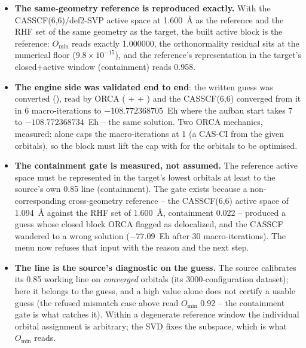 \begin{readbox}
\begin{itemize}
  \item \textbf{The same-geometry reference is reproduced exactly.}  With
    the CASSCF(6,6)/def2-SVP active space at 1.600~\AA{} as the reference
    and the RHF set of the same geometry as the target, the built active
    block is the reference: $O_{\min}$ reads exactly 1.000000, the
    orthonormality residual sits at the numerical floor
    ($9.8\times10^{-15}$), and the reference's representation in the
    target's closed+active window (containment) reads 0.958.
  \item \textbf{The engine side was validated end to end}: the written
    guess was converted (), read by ORCA
    ( +  +  )
    and the CASSCF(6,6) converged from it in 6 macro-iterations to
    $-108.772368705$~Eh where the aufbau start takes 7 to
    $-108.772368734$~Eh -- the same solution.  Two ORCA mechanics, measured:
     alone caps the macro-iterations at 1 (a CAS-CI from the
    given orbitals), so the  block must lift the cap with
     for the orbitals to be optimised.
  \item \textbf{The containment gate is measured, not assumed.}  The
    reference active space must be represented in the target's lowest
     orbitals at least to the source's own 0.85 line
    (containment).  The gate exists because a non-corresponding
    cross-geometry reference -- the CASSCF(6,6) active space of 1.094~\AA{}
    against the RHF set of 1.600~\AA{}, containment 0.022 -- produced a
    guess whose closed block ORCA flagged as delocalized, and the CASSCF
    wandered to a wrong solution ($-77.09$~Eh after 30 macro-iterations).
    The menu now refuses that input with the reason and the next step.
  \item \textbf{The  line is the source's diagnostic on the
    guess.}  The source calibrates its 0.85 working line on
    \emph{converged} orbitals (its 3000-configuration dataset); here it
    belongs to the guess, and a high value alone does not certify a usable
    guess (the refused mismatch case above read $O_{\min}$ 0.92 -- the
    containment gate is what catches it).  Within a degenerate reference
    window the individual orbital assignment is arbitrary; the SVD fixes
    the subspace, which is what $O_{\min}$ reads.
\end{itemize}
\end{readbox}

